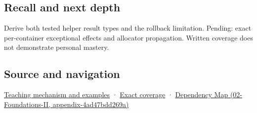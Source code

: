\subsection{Recall and next depth}\label{recall-and-next-depth}

Derive both tested helper result types and the rollback limitation. Pending: exact per-container exceptional effects and allocator propagation. Written coverage does not demonstrate personal mastery.

\subsection{Source and navigation}\label{source-and-navigation}

\href{Continuous\%20Notes/Computing\%20Foundations\%20-\%20From\%20Bits\%20to\%20C++\%20and\%20Systems\%20APIs\#Failure\%20guarantees\%20shape\%20the\%20transfer\%20algorithm}{Teaching mechanism and examples} · \hyperref[appendix-fd090d982a15]{Exact coverage} · \href{}{Dependency Map (02-Foundations-II, appendix-4ad47bdd269a)}
